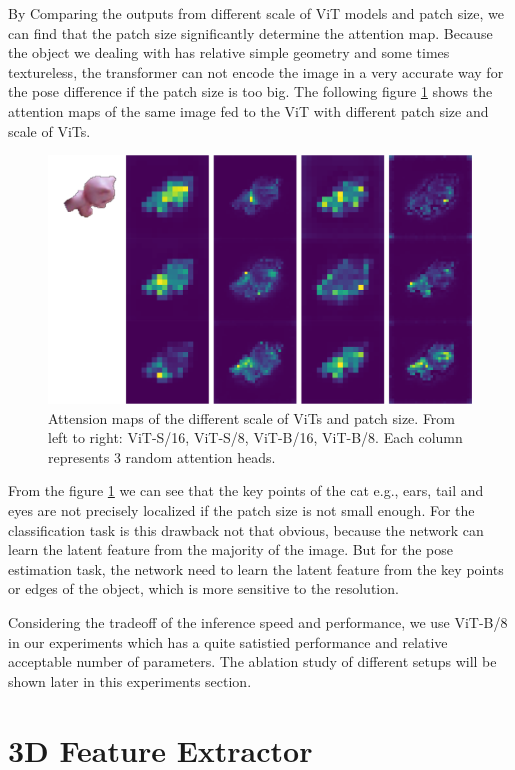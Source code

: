 \documentclass[12pt,DIV14,BCOR12mm,a4paper,footinclude=false,headinclude,parskip=half-,twoside,openright,cleardoublepage=empty,toc=index,bibliography=totoc,listof=totoc]{scrreprt}
\numberwithin{equation}{chapter}
\begin{document}
By Comparing the outputs from different scale of ViT models and patch size, we can find that the patch size significantly determine the attention map. Because the object we dealing with has relative simple geometry and some times textureless, the transformer can not encode the image in a very accurate way for the pose difference if the patch size is too big. The following figure \ref{img:atten_patch} shows the attention maps of the same image fed to the ViT with different patch size and scale of ViTs. 
\begin{figure}[h]
	\centering
	\includegraphics[scale=.65]{img/atten_cat.png}
	\caption{Attension maps of the different scale of ViTs and patch size. From left to right: ViT-S/16, ViT-S/8, ViT-B/16, ViT-B/8. Each column represents 3 random attention heads.}
	\label{img:atten_patch}
\end{figure}

From the figure \ref{img:atten_patch} we can see that the key points of the cat e.g., ears, tail and eyes are not precisely localized if the patch size is not small enough. For the classification task is this drawback not that obvious, because the network can learn the latent feature from the majority of the image. But for the pose estimation task, the network need to learn the latent feature from the key points or edges of the object, which is more sensitive to the resolution.

Considering the tradeoff of the inference speed and performance, we use ViT-B/8 in our experiments which has a quite satistied performance and relative acceptable number of parameters. The ablation study of different setups will be shown later in this experiments section.

\section{3D Feature Extractor}
\end{document}
